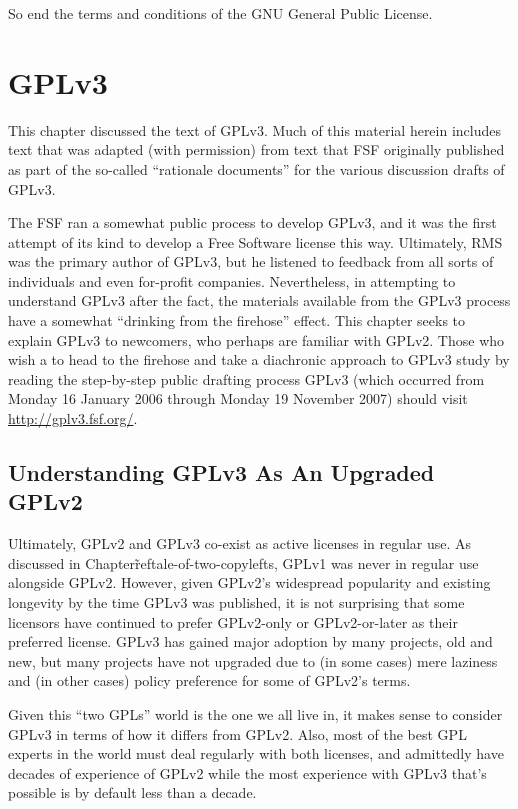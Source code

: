 So end the terms and conditions of the GNU General Public License.

\chapter{GPLv3}
\label{GPLv3}

This chapter discussed the text of GPLv3.  Much of this material herein
includes text that was adapted (with permission) from text that FSF
originally published as part of the so-called ``rationale documents'' for the
various discussion drafts of GPLv3.

The FSF ran a somewhat public process to develop GPLv3, and it was the first
attempt of its kind to develop a Free Software license this way.  Ultimately,
RMS was the primary author of GPLv3, but he listened to feedback from all
sorts of individuals and even for-profit companies.  Nevertheless, in
attempting to understand GPLv3 after the fact, the materials available from
the GPLv3 process have a somewhat ``drinking from the firehose'' effect.
This chapter seeks to explain GPLv3 to newcomers, who perhaps are familiar
with GPLv2.  Those who wish a to head to the firehose and take a diachronic
approach to GPLv3 study by reading the step-by-step public drafting process
GPLv3 (which occurred from Monday 16 January 2006 through Monday 19 November
2007) should visit \url{http://gplv3.fsf.org/}.

\section{Understanding GPLv3 As An Upgraded GPLv2}

Ultimately, GPLv2 and GPLv3 co-exist as active licenses in regular use.  As
discussed in Chapter\~ref{tale-of-two-copylefts}, GPLv1 was never in regular
use alongside GPLv2.  However, given GPLv2's widespread popularity and
existing longevity by the time GPLv3 was published, it is not surprising that
some licensors have continued to prefer GPLv2-only or GPLv2-or-later as their
preferred license.  GPLv3 has gained major adoption by many projects, old and
new, but many projects have not upgraded due to (in some cases) mere laziness
and (in other cases) policy preference for some of GPLv2's terms.

Given this ``two GPLs'' world is the one we all live in, it makes sense to
consider GPLv3 in terms of how it differs from GPLv2.  Also, most of the best
GPL experts in the world must deal regularly with both licenses, and
admittedly have decades of experience of GPLv2 while the most experience with
GPLv3 that's possible is by default less than a decade.

